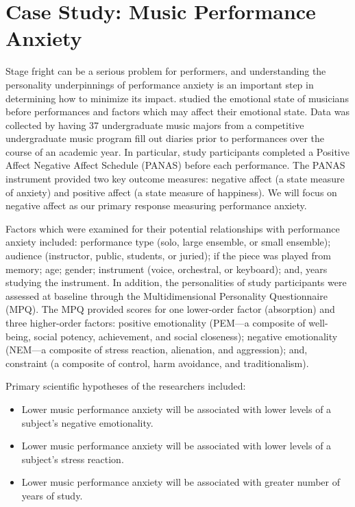 \documentclass[
]{krantz}
\providecommand{\tightlist}{%
  \setlength{\itemsep}{0pt}\setlength{\parskip}{0pt}}
\begin{document}
\hypertarget{cs:music}{%
\section{Case Study: Music Performance Anxiety}\label{cs:music}}

Stage fright can be a serious problem for performers, and understanding the personality underpinnings of performance anxiety is an important step in determining how to minimize its impact. \citet{Miller2010} studied the emotional state of musicians before performances and factors which may affect their emotional state. Data was collected by having 37 undergraduate music majors from a competitive undergraduate music program fill out diaries prior to performances over the course of an academic year. In particular, study participants completed a Positive Affect Negative Affect Schedule (PANAS) before each performance. The PANAS instrument provided two key outcome measures: negative affect (a state measure of anxiety) and positive affect (a state measure of happiness). We will focus on negative affect as our primary response measuring performance anxiety.

Factors which were examined for their potential relationships with performance anxiety included: performance type (solo, large ensemble, or small ensemble); audience (instructor, public, students, or juried); if the piece was played from memory; age; gender; instrument (voice, orchestral, or keyboard); and, years studying the instrument. In addition, the personalities of study participants were assessed at baseline through the Multidimensional Personality Questionnaire (MPQ). The MPQ provided scores for one lower-order factor (absorption) and three higher-order factors: positive emotionality (PEM---a composite of well-being, social potency, achievement, and social closeness); negative emotionality (NEM---a composite of stress reaction, alienation, and aggression); and, constraint (a composite of control, harm avoidance, and traditionalism).

Primary scientific hypotheses of the researchers included:

\begin{itemize}
\tightlist
\item
  Lower music performance anxiety will be associated with lower levels of a subject's negative emotionality.
\item
  Lower music performance anxiety will be associated with lower levels of a subject's stress reaction.
\item
  Lower music performance anxiety will be associated with greater number of years of study.
\end{itemize}
\end{document}
